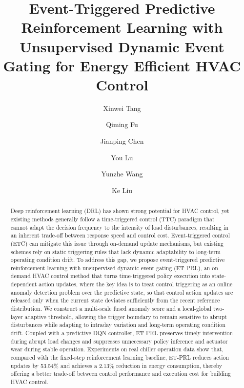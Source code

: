 \documentclass[preprint,12pt,number]{elsarticle}
\begin{document}
\begin{frontmatter}

\title{Event-Triggered Predictive Reinforcement Learning with Unsupervised Dynamic Event Gating for Energy Efficient HVAC Control}

\author[inst1,inst2]{Xinwei Tang}
\author[inst1,inst2]{Qiming Fu}
\author[inst1,inst2,inst3]{Jianping Chen}
\author[inst1,inst2]{You Lu}
\author[inst1,inst2]{Yunzhe Wang}
\author[inst4]{Ke Liu}

\begin{abstract}
Deep reinforcement learning (DRL) has shown strong potential for HVAC control, yet existing methods generally follow a time-triggered control (TTC) paradigm that cannot adapt the decision frequency to the intensity of load disturbances, resulting in an inherent trade-off between response speed and control cost. Event-triggered control (ETC) can mitigate this issue through on-demand update mechanisms, but existing schemes rely on static triggering rules that lack dynamic adaptability to long-term operating condition drift. To address this gap, we propose event-triggered predictive reinforcement learning with unsupervised dynamic event gating (ET-PRL), an on-demand HVAC control method that turns time-triggered policy execution into state-dependent action updates, where the key idea is to treat control triggering as an online anomaly detection problem over the predictive state, so that control action updates are released only when the current state deviates sufficiently from the recent reference distribution. We construct a multi-scale fused anomaly score and a local-global two-layer adaptive threshold, allowing the trigger boundary to remain sensitive to abrupt disturbances while adapting to intraday variation and long-term operating condition drift. Coupled with a predictive DQN controller, ET-PRL preserves timely intervention during abrupt load changes and suppresses unnecessary policy inference and actuator wear during stable operation. Experiments on real chiller operation data show that, compared with the fixed-step reinforcement learning baseline, ET-PRL reduces action updates by 53.54\% and achieves a 2.13\% reduction in energy consumption, thereby offering a better trade-off between control performance and execution cost for building HVAC control.
\end{abstract}


\end{frontmatter}
\end{document}

